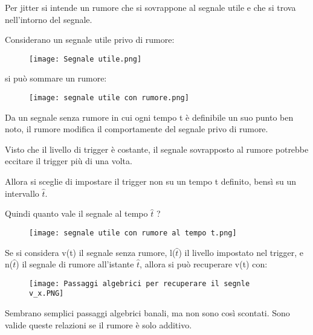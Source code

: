 Per jitter si intende un rumore che si sovrappone al segnale utile e che si trova nell'intorno del segnale. \newline 

Considerano un segnale utile privo di rumore: 


\begin{figure}[h]
    \centering
    \texttt{[image: Segnale utile.png]}
\end{figure}

si può sommare un rumore: 

\begin{figure}[h]
    \centering
    \texttt{[image: segnale utile con rumore.png]}
\end{figure}

Da un segnale senza rumore in cui ogni tempo t è definibile un suo punto ben noto, 
il rumore modifica il comportamente del segnale privo di rumore. \newline 

Visto che il livello di trigger è costante, il segnale sovrapposto al rumore potrebbe eccitare il trigger più di una volta. \newline 

Allora si sceglie di impostare il trigger non su un tempo t definito, bensì su un intervallo $\hat{t}$. \newline 

Quindi quanto vale il segnale al tempo $\hat{t}$  ? 

\begin{figure}[h]
    \centering
    \texttt{[image: segnale utile con rumore al tempo t.png]}
\end{figure}

Se si considera v(t) il segnale senza rumore, l($\hat{t}$) il livello impostato nel trigger, 
e n($\hat{t}$) il segnale di rumore all'istante $\hat{t}$, allora si può recuperare v(t) con: 

\begin{figure}[h]
    \centering
    \texttt{[image: Passaggi algebrici per recuperare il segnle v\_x.PNG]}
\end{figure}

\newpage 

\begin{tcolorbox}
    Sembrano semplici passaggi algebrici banali, ma non sono così scontati. \newline 
    Sono valide queste relazioni se il rumore è solo additivo.  
\end{tcolorbox}

